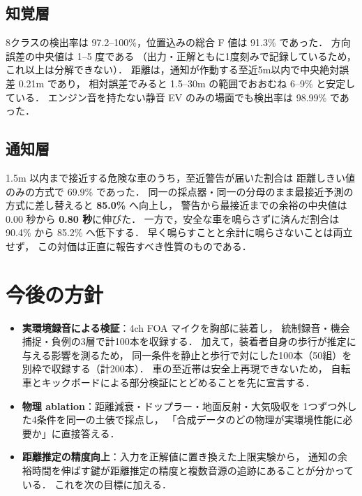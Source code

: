 \documentclass[twocolumn,a4paper,9pt]{jsarticle}
\begin{document}
\subsection{知覚層}
8クラスの検出率は 97.2--100\%，位置込みの総合 F 値は 91.3\% であった．
方向誤差の中央値は 1--5 度である
（出力・正解ともに1度刻みで記録しているため，これ以上は分解できない）．
距離は，通知が作動する至近5m以内で中央絶対誤差 0.21m であり，
相対誤差でみると 1.5--30m の範囲でおおむね 6--9\% と安定している．
エンジン音を持たない静音 EV のみの場面でも検出率は 98.99\% であった．

\subsection{通知層}
1.5m 以内まで接近する危険な車のうち，至近警告が届いた割合は
距離しきい値のみの方式で 69.9\% であった．
同一の採点器・同一の分母のまま最接近予測の方式に差し替えると
\textbf{85.0\%} へ向上し，
警告から最接近までの余裕の中央値は 0.00 秒から \textbf{0.80 秒}に伸びた．
一方で，安全な車を鳴らさずに済んだ割合は 90.4\% から 85.2\% へ低下する．
早く鳴らすことと余計に鳴らさないことは両立せず，
この対価は正直に報告すべき性質のものである．

\section{今後の方針}

\begin{itemize}\itemsep=0pt
  \item \textbf{実環境録音による検証}：4ch FOA マイクを胸部に装着し，
        統制録音・機会捕捉・負例の3層で計100本を収録する．
        加えて，装着者自身の歩行が推定に与える影響を測るため，
        同一条件を静止と歩行で対にした100本（50組）を別枠で収録する（計200本）．
        車の至近帯は安全上再現できないため，
        自転車とキックボードによる部分検証にとどめることを先に宣言する．
  \item \textbf{物理 ablation}：距離減衰・ドップラー・地面反射・大気吸収を
        1つずつ外した4条件を同一の土俵で採点し，
        「合成データのどの物理が実環境性能に必要か」に直接答える．
  \item \textbf{距離推定の精度向上}：入力を正解値に置き換えた上限実験から，
        通知の余裕時間を伸ばす鍵が距離推定の精度と複数音源の追跡にあることが分かっている．
        これを次の目標に加える．
\end{itemize}
\end{document}
